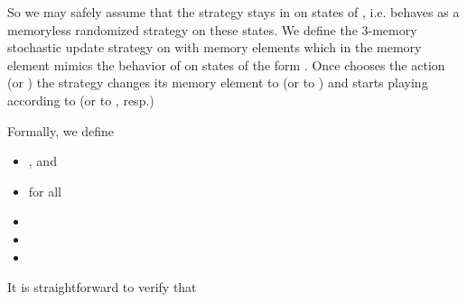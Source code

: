 So we may safely assume that the strategy  stays in  on states of , i.e. behaves as a memoryless randomized strategy on these states. We define the 3-memory stochastic update strategy  on  with memory elements   which in the memory element  mimics the behavior of  on states of the form . Once  chooses the action  (or ) the strategy  changes its memory element to  (or to ) and starts playing according to  (or to , resp.)
 
 Formally, we define
\begin{itemize}
\item ,  and 
\item   for all 
\item 
\item 
\item 
\end{itemize}
It is straightforward to verify that 




